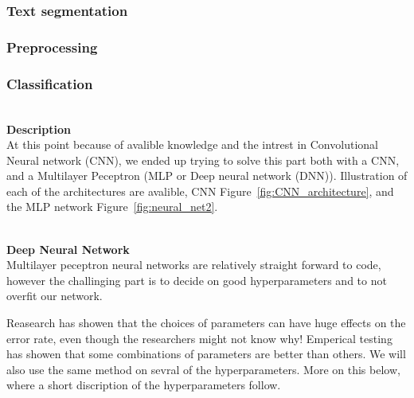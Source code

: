 \documentclass[11pt,a4paper,english]{article}
\begin{document}
\subsubsection{Text segmentation}
\subsubsection{Preprocessing}


\subsubsection{Classification}
\noindent \\ \textbf{Description}
\noindent \\ At this point because of avalible knowledge and the intrest in
Convolutional Neural network (CNN), we ended up trying to solve this part
both with a CNN, and a Multilayer Peceptron (MLP or Deep neural network (DNN)).
Illustration of each of the architectures are avalible, CNN Figure~\ref{fig:CNN_architecture},
and the MLP network Figure~\ref{fig:neural_net2}.

\noindent \\ \textbf{Deep Neural Network}
\noindent \\ Multilayer peceptron neural networks are relatively straight
forward to code, however the challinging part is to decide on good
hyperparameters and to not overfit our network. \par
Reasearch has showen that the choices of parameters can have huge effects on
the error rate, even though the researchers might not know why! Emperical
testing has showen that some combinations of parameters are better than others.
We will also use the same method on sevral of the hyperparameters. More on
this below, where a short discription of the hyperparameters follow.
\end{document}
